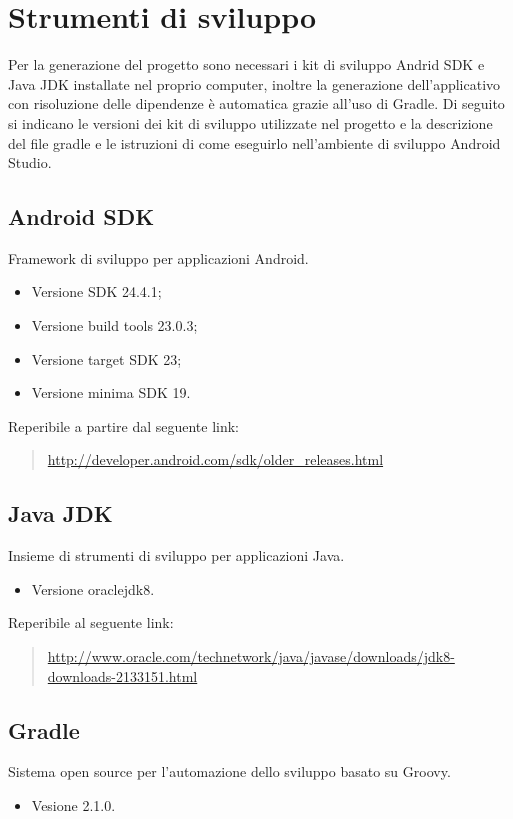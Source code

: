 \documentclass[../ManualeSviluppatore.tex]{subfiles}
\begin{document}
\section{Strumenti di sviluppo}
	
	Per la generazione del progetto sono necessari i kit di sviluppo Andrid SDK e \gls{Java} JDK installate nel proprio computer, inoltre la generazione dell'applicativo con risoluzione delle dipendenze è automatica grazie all'uso di Gradle.
	Di seguito si indicano le versioni dei kit di sviluppo utilizzate nel progetto e la descrizione del file gradle e le istruzioni di come eseguirlo nell'ambiente di sviluppo \gls{Android Studio}.

	\subsection{Android SDK}
	 \gls{Framework} di sviluppo per applicazioni \gls{Android}.
		\begin{itemize} 
			\item Versione SDK 24.4.1;
			\item Versione build tools 23.0.3;
			\item Versione target SDK 23;
			\item Versione minima SDK 19.
		\end{itemize}
		Reperibile a partire dal seguente link:
		\begin{quote}
			\centering
			\url{http://developer.android.com/sdk/older_releases.html}
		\end{quote}
		
	\subsection{Java JDK}
		Insieme di strumenti di sviluppo per applicazioni \gls{Java}. 
		\begin{itemize} 
			\item Versione oraclejdk8.
		\end{itemize}
		Reperibile al seguente link:
		\begin{quote}
			\centering
			\url{http://www.oracle.com/technetwork/java/javase/downloads/jdk8-downloads-2133151.html}
		\end{quote}
		
	\newpage
	\subsection{Gradle}
	\label{subsec:Gradle}
		Sistema \gls{open source} per l'automazione dello sviluppo basato su Groovy.
		\begin{itemize} 
			\item Vesione 2.1.0.
		\end{itemize}
		
\end{document}
